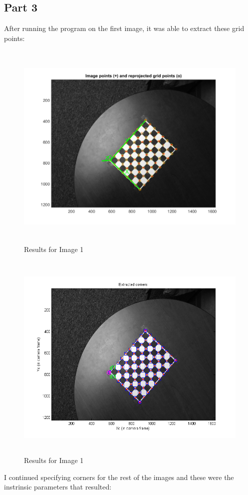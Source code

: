 \documentclass[11pt,psfig]{article}
\begin{document}
\subsection{Part 3}

After running the program on the first image, it was able to extract these grid points:
\begin{figure}[H]
\centering
\includegraphics[height=4in]{prob3plot1.png}
\caption{Results for Image 1}
\end{figure}
\begin{figure}[H]
\centering
\includegraphics[height=4in]{prob3plot2.png}
\caption{Results for Image 1}
\end{figure}
I continued specifying corners for the rest of the images and these were the instrinsic parameters that resulted:
\end{document}
